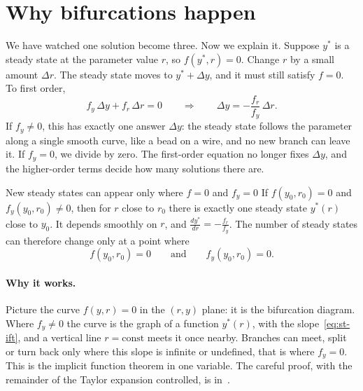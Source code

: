 \section{Why bifurcations happen}\label{sec:st-why}
%

We have watched one solution become three. Now we explain it. Suppose $y^*$ is a
steady state at the parameter value $r$, so $f(y^*,r) = 0$. Change $r$ by a small
amount $\Delta r$. The steady state moves to $y^* + \Delta y$, and it must still
satisfy $f = 0$. To first order,
\begin{equation}\label{eq:st-ift}
  f_y\,\Delta y + f_r\,\Delta r = 0
  \qquad\Longrightarrow\qquad
  \Delta y = -\frac{f_r}{f_y}\,\Delta r .
\end{equation}
If $f_y \neq 0$, this has exactly one answer $\Delta y$: the steady state follows
the parameter along a single smooth curve, like a bead on a wire, and no new
branch can leave it. If $f_y = 0$, we divide by zero. The first-order equation no
longer fixes $\Delta y$, and the higher-order terms decide how many solutions
there are.

\begin{gbox}{New steady states can appear only where $f = 0$ and $f_y = 0$}\label{sec:st-ift}
%
If $f(y_0,r_0) = 0$ and $f_y(y_0,r_0) \neq 0$, then for $r$ close to $r_0$ there
is exactly one steady state $y^*(r)$ close to $y_0$. It depends smoothly on $r$,
and $\displaystyle\frac{dy^*}{dr} = -\frac{f_r}{f_y}$. The number of steady states
can therefore change only at a point where
\begin{equation}\label{eq:st-bifcondition}
  f(y_0,r_0) = 0 \qquad\text{and}\qquad f_y(y_0,r_0) = 0 .
\end{equation}
\end{gbox}

\paragraph{Why it works.}
Picture the curve $f(y,r) = 0$ in the $(r,y)$ plane: it is the bifurcation
diagram. Where $f_y \neq 0$ the curve is the graph of a function $y^*(r)$, with
the slope~\eqref{eq:st-ift}, and a vertical line $r = \text{const}$ meets it once
nearby. Branches can meet, split or turn back only where this slope is
infinite or undefined, that is where $f_y = 0$. This is the implicit function
theorem in one variable. The careful proof, with the remainder of the Taylor
expansion controlled, is in~\cite{st-guckenheimer1983}.


